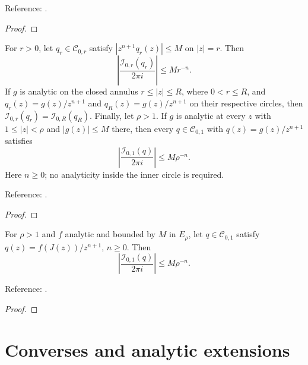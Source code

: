 \begin{supporting}
\begin{theorem}
Reference: \cite[Chapters 4 and 8]{atap}.
\end{theorem}
\begin{proof}
\leanok
\end{proof}

\begin{theorem}
\label{thm:laurent-bound}
\leanok
For $r>0$, let $q_r\in\mathcal C_{0,r}$ satisfy
$|z^{n+1}q_r(z)|\le M$ on $|z|=r$. Then
\[
\left|\frac{\mathcal I_{0,r}(q_r)}{2\pi i}\right|\le M r^{-n}.
\]
If $g$ is analytic on the closed annulus $r\le|z|\le R$, where $0<r\le R$,
and $q_r(z)=g(z)/z^{n+1}$ and $q_R(z)=g(z)/z^{n+1}$ on their respective
circles, then $\mathcal I_{0,r}(q_r)=\mathcal I_{0,R}(q_R)$.
Finally, let $\rho>1$. If $g$ is analytic at every $z$ with
$1\le|z|<\rho$ and $|g(z)|\le M$ there, then every $q\in\mathcal C_{0,1}$ with $q(z)=g(z)/z^{n+1}$ satisfies
\[
\left|\frac{\mathcal I_{0,1}(q)}{2\pi i}\right|\le M\rho^{-n}.
\]
Here $n\ge0$; no analyticity inside the inner circle is required.

Reference: \cite[proof of Theorem 8.1]{atap}.
\end{theorem}
\begin{proof}
\leanok
\end{proof}

\begin{theorem}
\label{thm:joukowski-coefficient-bound}
\leanok
For $\rho>1$ and $f$ analytic and bounded by $M$ in $E_\rho$, let $q\in\mathcal C_{0,1}$ satisfy $q(z)=f(J(z))/z^{n+1}$, $n\ge0$.
Then
\[
\left|\frac{\mathcal I_{0,1}(q)}{2\pi i}\right|\le M\rho^{-n}.
\]

Reference: \cite[proof of Theorem 8.1]{atap}.
\end{theorem}
\begin{proof}
\leanok
\end{proof}

\end{supporting}

\section{Converses and analytic extensions}\label{sec:textbook-analytic-converse}

